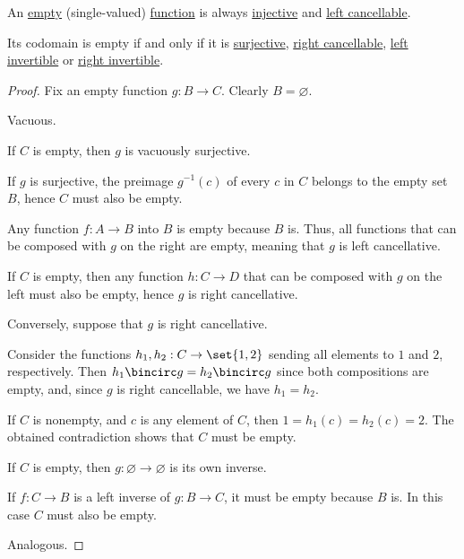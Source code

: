 \begin{lemma}\label{thm:empty_function_invertibility}
  An \hyperref[def:set_valued_function/empty]{empty} (single-valued) \hyperref[def:function]{function} is always \hyperref[def:function_invertibility/injective]{injective} and \hyperref[def:morphism_cancellation/left]{left cancellable}.

  Its codomain is empty if and only if it is \hyperref[def:function_invertibility/surjective]{surjective}, \hyperref[def:morphism_cancellation/right]{right cancellable}, \hyperref[def:morphism_invertibility/left]{left invertible} or \hyperref[def:morphism_invertibility/right]{right invertible}.
\end{lemma}
\begin{proof}
  Fix an empty function \( g: B \to C \). Clearly \( B = \varnothing \).

   Vacuous.


  \SufficiencySubProof* If \( C \) is empty, then \( g \) is vacuously surjective.

  \NecessitySubProof* If \( g \) is surjective, the preimage \( g^{-1}(c) \) of every \( c \) in \( C \) belongs to the empty set \( B \), hence \( C \) must also be empty.

   Any function \( f: A \to B \) into \( B \) is empty because \( B \) is. Thus, all functions that can be composed with \( g \) on the right are empty, meaning that \( g \) is left cancellative.


  \SufficiencySubProof* If \( C \) is empty, then any function \( h: C \to D \) that can be composed with \( g \) on the left must also be empty, hence \( g \) is right cancellative.

  \NecessitySubProof* Conversely, suppose that \( g \) is right cancellative.

  Consider the functions \( h_1, h_2: C \to \set{ 1, 2 } \) sending all elements to \( 1 \) and \( 2 \), respectively. Then \( h_1 \bincirc g = h_2 \bincirc g \) since both compositions are empty, and, since \( g \) is right cancellable, we have \( h_1 = h_2 \).

  If \( C \) is nonempty, and \( c \) is any element of \( C \), then \( 1 = h_1(c) = h_2(c) = 2 \). The obtained contradiction shows that \( C \) must be empty.


  \SufficiencySubProof* If \( C \) is empty, then \( g: \varnothing \to \varnothing \) is its own inverse.

  \NecessitySubProof* If \( f: C \to B \) is a left inverse of \( g: B \to C \), it must be empty because \( B \) is. In this case \( C \) must also be empty.

   Analogous.
\end{proof}

